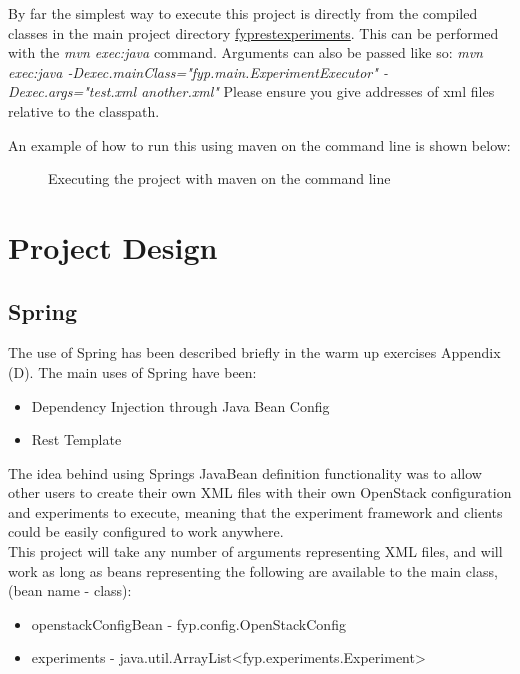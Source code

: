 By far the simplest way to execute this project is directly from the compiled classes in the main project directory \url{fyprestexperiments}. This can be performed with the \textit{mvn exec:java} command. Arguments can also be passed like so: \textit{mvn exec:java -Dexec.mainClass="fyp.main.ExperimentExecutor" -Dexec.args="test.xml another.xml"} Please ensure you give addresses of xml files relative to the classpath. 

An example of how to run this using maven on the command line is shown below: 

\begin{figure}[H]
\centering
{}
\caption{Executing the project with maven on the command line}
\end{figure} 

\section{Project Design}
\subsection{Spring}
The use of Spring has been described briefly in the warm up exercises Appendix (D). The main uses of Spring have been: 
\begin{itemize}
\item Dependency Injection through Java Bean Config
\item Rest Template 
\end{itemize}

The idea behind using Springs JavaBean definition functionality was to allow other users to create their own XML files with their own OpenStack configuration and experiments to execute, meaning that the experiment framework and clients could be easily configured to work anywhere. \\

This project will take any number of arguments representing XML files, and will work as long as beans representing the following are available to the main class, (bean name - class):
\begin{itemize}
\item openstackConfigBean - fyp.config.OpenStackConfig
\item experiments - java.util.ArrayList<fyp.experiments.Experiment>
\end{itemize}

